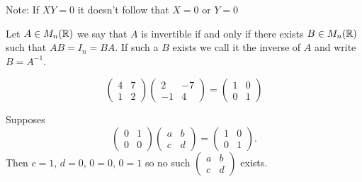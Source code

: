 \documentclass[10pt, a4paper]{article}
\begin{document}
Note: If $XY = 0$ it doesn't follow that $X = 0$ or $Y = 0$

\begin{definition}
    Let $A \in M_n(\mathbb{R})$ we say that $A$ is invertible if and only if there exists $B \in M_n(\mathbb{R})$ such that $AB = I_n = BA$. If such a $B$ exists we call it the inverse of $A$ and write $B = A^{-1}$. 
\end{definition}

\begin{example}
    \[
    \begin{pmatrix}
        4 & 7 \\ 1 & 2
    \end{pmatrix}
    \begin{pmatrix}
     2 & -7 \\ -1 & 4
    \end{pmatrix}
    =
    \begin{pmatrix}
        1 & 0 \\ 0 & 1
    \end{pmatrix}
    \]
\end{example}

\begin{example}
    Supposes \[
    \begin{pmatrix}
        0 & 1 \\ 0 & 0
    \end{pmatrix}
    \begin{pmatrix}
        a & b \\ c & d
    \end{pmatrix}
    =
    \begin{pmatrix}
        1 & 0 \\ 0 & 1
    \end{pmatrix}.
    \]
    Then $c = 1,\, d = 0,\, 0 = 0,\, 0 = 1$ so no such $\begin{pmatrix}
        a & b \\ c & d
    \end{pmatrix}$ exists.
\end{example}
\end{document}
